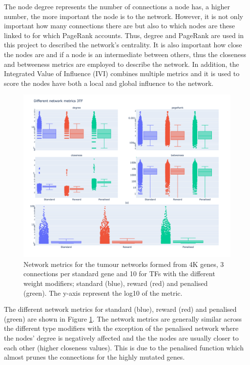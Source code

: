 The node degree represents the number of connections a node has, a higher number, the more important the node is to the network. However, it is not only important how many connections there are but also to which nodes are these linked to for which PageRank\cite{Brin1998-mc} accounts. Thus, degree and PageRank are used in this project to described the network's centrality. It is also important how close the nodes are and if a node is an intermediate between others, thus the closeness and betweeness metrics are employed to describe the network. In addition, the Integrated Value of Influence (IVI) \cite{Salavaty2020-wo} combines multiple metrics and it is used to score the nodes have both a local and global influence to the network.

\begin{figure}[!htb]    \centering\includegraphics[width=1.0\textwidth,height=0.7\textheight,keepaspectratio]{Sections/Network_I/Resources/Tum_network/NetworkMetricsComp_10TF.png}
    \caption{Network metrics for the tumour networks formed from 4K genes, 3 connections per standard gene and 10 for TFs with the different weight modifiers; standard (blue), reward (red) and penalised (green). The y-axis represent the log10 of the metric. }
    \label{fig:N_I:net_metrics_tum}
\end{figure}

The different network metrics for standard (blue), reward (red) and penalised (green) are shown in Figure \ref{fig:N_I:net_metrics_tum}. The network metrics are generally similar across the different type modifiers with the exception of the penalised network where the nodes' degree is negatively affected and the the nodes are usually closer to each other (higher closeness values). This is due to the penalised function which almost prunes the connections for the highly mutated genes.

